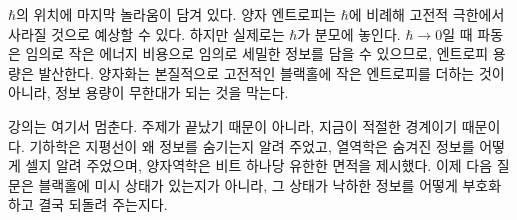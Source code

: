 \(\hbar\)의 위치에 마지막 놀라움이 담겨 있다. 양자 엔트로피는 \(\hbar\)에 비례해 고전적 극한에서 사라질 것으로 예상할 수 있다. 하지만 실제로는 \(\hbar\)가 분모에 놓인다. \(\hbar\to0\)일 때 파동은 임의로 작은 에너지 비용으로 임의로 세밀한 정보를 담을 수 있으므로, 엔트로피 용량은 발산한다. 양자화는 본질적으로 고전적인 블랙홀에 작은 엔트로피를 더하는 것이 아니라, 정보 용량이 무한대가 되는 것을 막는다.

\begin{classroomqa}\end{classroomqa}

강의는 여기서 멈춘다. 주제가 끝났기 때문이 아니라, 지금이 적절한 경계이기 때문이다. 기하학은 지평선이 왜 정보를 숨기는지 알려 주었고, 열역학은 숨겨진 정보를 어떻게 셀지 알려 주었으며, 양자역학은 비트 하나당 유한한 면적을 제시했다. 이제 다음 질문은 블랙홀에 미시 상태가 있는지가 아니라, 그 상태가 낙하한 정보를 어떻게 부호화하고 결국 되돌려 주는지다.